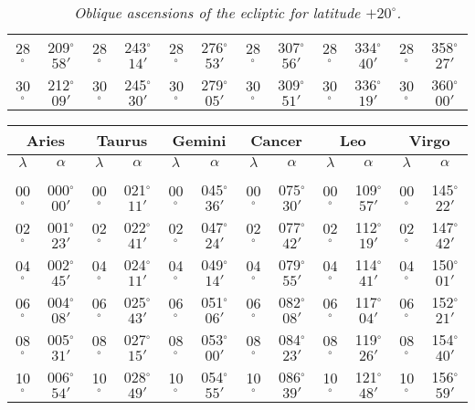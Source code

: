 \begin{table}
{\begin{tabular}{cc|cc|cc|cc|cc|cc}
28$^\circ$ & 209$^\circ$$58'$ & 28$^\circ$ & 243$^\circ$$14'$ & 28$^\circ$ & 276$^\circ$$53'$ & 28$^\circ$ & 307$^\circ$$56'$ &  28$^\circ$ & 334$^\circ$$40'$ & 28$^\circ$ & 358$^\circ$$27'$\\
30$^\circ$ & 212$^\circ$$09'$ & 30$^\circ$ & 245$^\circ$$30'$ & 30$^\circ$ & 279$^\circ$$05'$ & 30$^\circ$ & 309$^\circ$$51'$ &  30$^\circ$ & 336$^\circ$$19'$ & 30$^\circ$ & 360$^\circ$$00'$\\
\end{tabular}}
\caption{\em Oblique ascensions of the ecliptic for latitude $+20^\circ$.}
\end{table}


\begin{table}
\centering
{\small \begin{tabular}{cc|cc|cc|cc|cc|cc}
\multicolumn{2}{c}{Aries}\vline & \multicolumn{2}{c}{Taurus} \vline& \multicolumn{2}{c}{Gemini} \vline& \multicolumn{2}{c}{Cancer}\vline &
\multicolumn{2}{c}{Leo}\vline & \multicolumn{2}{c}{Virgo}\\\hline
$\lambda$& $\alpha$& $\lambda$& $\alpha$& $\lambda$& $\alpha$& $\lambda$& $\alpha$& $\lambda$& $\alpha$& $\lambda$& $\alpha$\\\hline
&&&&&&&&&&&\\[-2ex]
00$^\circ$ & 000$^\circ$$00'$ & 00$^\circ$ & 021$^\circ$$11'$ & 00$^\circ$ & 045$^\circ$$36'$ & 00$^\circ$ & 075$^\circ$$30'$ & 00$^\circ$ & 109$^\circ$$57'$ & 00$^\circ$ & 145$^\circ$$22'$\\
02$^\circ$ & 001$^\circ$$23'$ & 02$^\circ$ & 022$^\circ$$41'$ & 02$^\circ$ & 047$^\circ$$24'$ & 02$^\circ$ & 077$^\circ$$42'$ & 02$^\circ$ & 112$^\circ$$19'$ & 02$^\circ$ & 147$^\circ$$42'$\\
04$^\circ$ & 002$^\circ$$45'$ & 04$^\circ$ & 024$^\circ$$11'$ & 04$^\circ$ & 049$^\circ$$14'$ & 04$^\circ$ & 079$^\circ$$55'$ & 04$^\circ$ & 114$^\circ$$41'$ & 04$^\circ$ & 150$^\circ$$01'$\\
06$^\circ$ & 004$^\circ$$08'$ & 06$^\circ$ & 025$^\circ$$43'$ & 06$^\circ$ & 051$^\circ$$06'$ & 06$^\circ$ & 082$^\circ$$08'$ & 06$^\circ$ & 117$^\circ$$04'$ & 06$^\circ$ & 152$^\circ$$21'$\\
08$^\circ$ & 005$^\circ$$31'$ & 08$^\circ$ & 027$^\circ$$15'$ & 08$^\circ$ & 053$^\circ$$00'$ & 08$^\circ$ & 084$^\circ$$23'$ & 08$^\circ$ & 119$^\circ$$26'$ & 08$^\circ$ & 154$^\circ$$40'$\\
10$^\circ$ & 006$^\circ$$54'$ & 10$^\circ$ & 028$^\circ$$49'$ & 10$^\circ$ & 054$^\circ$$55'$ & 10$^\circ$ & 086$^\circ$$39'$ & 10$^\circ$ & 121$^\circ$$48'$ & 10$^\circ$ & 156$^\circ$$59'$\\

\end{tabular}}
\end{table}
